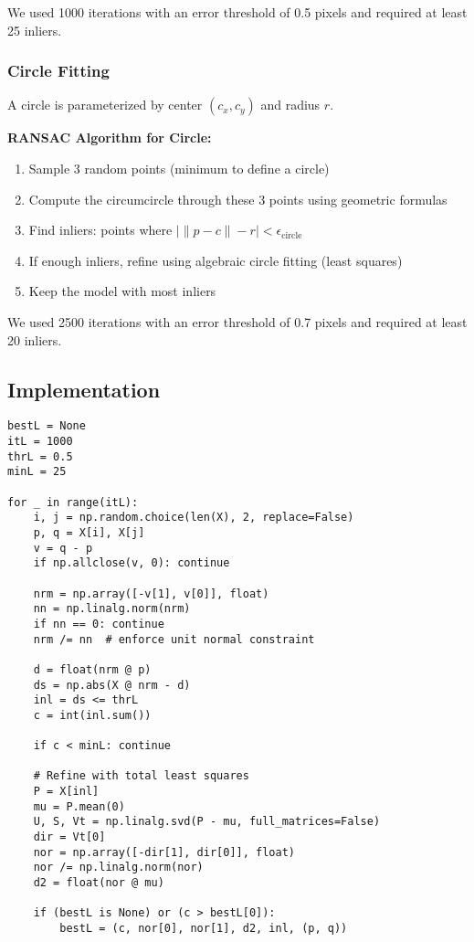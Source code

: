 \documentclass[11pt,a4paper]{article}
\begin{document}
We used 1000 iterations with an error threshold of 0.5 pixels and required at least 25 inliers.

\subsubsection{Circle Fitting}
A circle is parameterized by center $(c_x, c_y)$ and radius $r$.

\textbf{RANSAC Algorithm for Circle:}
\begin{enumerate}
    \item Sample 3 random points (minimum to define a circle)
    \item Compute the circumcircle through these 3 points using geometric formulas
    \item Find inliers: points where $|\|p - c\| - r| < \epsilon_{\text{circle}}$
    \item If enough inliers, refine using algebraic circle fitting (least squares)
    \item Keep the model with most inliers
\end{enumerate}

We used 2500 iterations with an error threshold of 0.7 pixels and required at least 20 inliers.

\subsection{Implementation}

\begin{lstlisting}[caption={RANSAC line fitting with unit normal constraint}]
bestL = None
itL = 1000
thrL = 0.5
minL = 25

for _ in range(itL):
    i, j = np.random.choice(len(X), 2, replace=False)
    p, q = X[i], X[j]
    v = q - p
    if np.allclose(v, 0): continue
    
    nrm = np.array([-v[1], v[0]], float)
    nn = np.linalg.norm(nrm)
    if nn == 0: continue
    nrm /= nn  # enforce unit normal constraint
    
    d = float(nrm @ p)
    ds = np.abs(X @ nrm - d)
    inl = ds <= thrL
    c = int(inl.sum())
    
    if c < minL: continue
    
    # Refine with total least squares
    P = X[inl]
    mu = P.mean(0)
    U, S, Vt = np.linalg.svd(P - mu, full_matrices=False)
    dir = Vt[0]
    nor = np.array([-dir[1], dir[0]], float)
    nor /= np.linalg.norm(nor)
    d2 = float(nor @ mu)
    
    if (bestL is None) or (c > bestL[0]):
        bestL = (c, nor[0], nor[1], d2, inl, (p, q))
\end{lstlisting}
\end{document}
